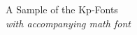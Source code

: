 \documentclass[10pt]{article}
\begin{document}
{\LARGE \noindent A Sample of the Kp-Fonts}\\

{\large \noindent \textit{with accompanying math font}}\\[5pt]


\end{document}
